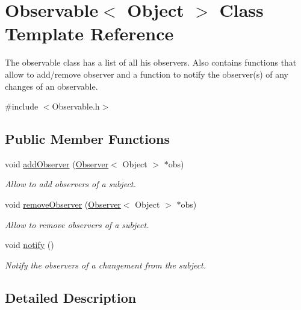 \hypertarget{class_observable}{}\section{Observable$<$ Object $>$ Class Template Reference}
\label{class_observable}


The observable class has a list of all his observers. Also contains functions that allow to add/remove observer and a function to notify the observer(s) of any changes of an observable.  




{\ttfamily \#include $<$Observable.\+h$>$}

\subsection*{Public Member Functions}
\begin{DoxyCompactItemize}
\item 
void \mbox{\hyperlink{class_observable_ae32f005844f7abe6d3984cca9a13e2a2}{add\+Observer}} (\mbox{\hyperlink{class_observer}{Observer}}$<$ Object $>$ $\ast$obs)
\begin{DoxyCompactList}\small\item\em Allow to add observers of a subject. \end{DoxyCompactList}\item 
void \mbox{\hyperlink{class_observable_ae247227a79f81f542d7fe0634a55cdaa}{remove\+Observer}} (\mbox{\hyperlink{class_observer}{Observer}}$<$ Object $>$ $\ast$obs)
\begin{DoxyCompactList}\small\item\em Allow to remove observers of a subject. \end{DoxyCompactList}\item 
\mbox{\label{class_observable_a1fc03776d2f198f2a102f55b2a2946c1}} 
void \mbox{\hyperlink{class_observable_a1fc03776d2f198f2a102f55b2a2946c1}{notify}} ()
\begin{DoxyCompactList}\small\item\em Notify the observers of a changement from the subject. \end{DoxyCompactList}\end{DoxyCompactItemize}


\subsection{Detailed Description}
